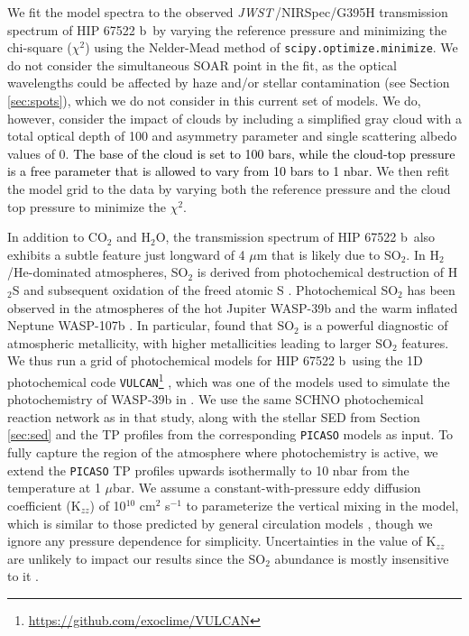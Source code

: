 \documentclass[twocolumn]{aastex63} %
\newcommand{\jwst}{\textit{JWST}}
\newcommand{\plname}{HIP 67522 b}
\newcommand{\newedit}[1]{\textcolor{black}{#1}}
\begin{document}
We fit the model spectra to the observed \jwst\,/NIRSpec/G395H transmission spectrum of \plname\ by varying the reference pressure and minimizing the chi-square ($\chi^2$) using the Nelder-Mead method of \texttt{scipy.optimize.minimize}. We do not consider the simultaneous SOAR point in the fit, as the optical wavelengths could be affected by haze and/or stellar contamination (see Section \ref{sec:spots}), which we do not consider in this current set of models. We do, however, consider the impact of clouds by including a simplified gray cloud with a total optical depth of 100 and asymmetry parameter and single scattering albedo values of 0. \newedit{The base of the cloud is set to 100 bars, while the cloud-top pressure is a free parameter that is allowed to vary from 10 bars to 1 nbar.} We then refit the model grid to the data by varying both the reference pressure and the cloud top pressure to minimize the $\chi^2$.

In addition to CO$_2$ and H$_2$O, the transmission spectrum of \plname\ also exhibits a subtle feature just longward of 4 $\mu$m that is likely due to SO$_2$. In H$_2$/He-dominated atmospheres, SO$_2$ is derived from photochemical destruction of H$_2$S and subsequent oxidation of the freed atomic S \citep{Zahnle2009,Tsai2021}. Photochemical SO$_2$ has been observed in the atmospheres of the hot Jupiter WASP-39b \citep{rustamkulov2023early,Alderson2023,Tsai2023} and the warm inflated Neptune WASP-107b \citep{Dyrek2024}. In particular, \citet{Tsai2023} found that SO$_2$ is a powerful diagnostic of atmospheric metallicity, with higher metallicities leading to larger SO$_2$ features. We thus run a grid of photochemical models for \plname\ using the 1D photochemical code \texttt{VULCAN}\footnote{\url{https://github.com/exoclime/VULCAN}} \citep{Tsai2017,Tsai2021}, which was one of the models used to simulate the photochemistry of WASP-39b in \citet{Tsai2023}. We use the same SCHNO photochemical reaction network as in that study, along with the stellar SED from Section \ref{sec:sed} and the TP profiles from the corresponding \texttt{PICASO} models as input. To fully capture the region of the atmosphere where photochemistry is active, we extend the \texttt{PICASO} TP profiles upwards isothermally to 10 nbar from the temperature at 1 $\mu$bar. We assume a constant-with-pressure eddy diffusion coefficient (K$_{zz}$) of 10$^{10}$ cm$^2$ s$^{-1}$ to parameterize the vertical mixing in the model, which is similar to those predicted by general circulation models \citep[e.g.][]{Parmentier2013,Agundez2014}, though we ignore any pressure dependence for simplicity. Uncertainties in the value of K$_{zz}$ are unlikely to impact our results since the SO$_2$ abundance is mostly insensitive to it \citep{Tsai2023}. 
\end{document}
